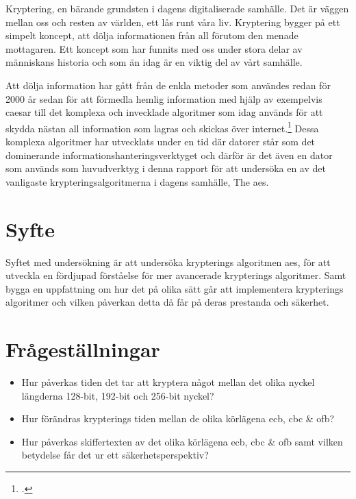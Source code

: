 Kryptering, en bärande grundsten i dagens digitaliserade samhälle. Det är väggen mellan oss och resten
av världen, ett lås runt våra liv. Kryptering bygger på ett simpelt koncept, att dölja informationen
från all förutom den menade mottagaren. Ett koncept som har funnits med oss under stora delar av
människans historia och som än idag är en viktig del av vårt samhälle.

Att dölja information har gått från de enkla metoder som användes redan för 2000 år sedan för att förmedla hemlig information med hjälp av
exempelvis \gls{caesar} till det komplexa och invecklade algoritmer som idag används för att skydda nästan all information som lagras och skickas
över internet.\footcite{luciano1987cryptology} Dessa komplexa algoritmer har utvecklats under en tid där datorer står som det dominerande informationshanteringsverktyget och
därför är det även en dator som används som huvudverktyg i denna rapport för att undersöka en av det vanligaste krypteringsalgoritmerna i dagens samhälle,
The \acrlong{aes}.

\section{Syfte} %
Syftet med undersökning är att undersöka krypterings algoritmen \acrshort{aes},
för att utveckla en fördjupad förståelse för mer avancerade krypterings algoritmer.
Samt bygga en uppfattning om hur det på olika sätt går att implementera krypterings algoritmer
och vilken påverkan detta då får på deras prestanda och säkerhet.

\section{Frågeställningar} %
\begin{itemize}
    \setlength{\itemindent}{-1em}
    \item Hur påverkas tiden det tar att kryptera något mellan det olika nyckel längderna 128-bit,
          192-bit och 256-bit nyckel?

    \item Hur förändras krypterings tiden mellan de olika körlägena \acrshort{ecb}, \acrshort{cbc} \& \acrshort{ofb}?

    \item Hur påverkas skiffertexten av det olika körlägena \acrshort{ecb}, \acrshort{cbc} \& \acrshort{ofb}
          samt vilken betydelse får det ur ett säkerhetsperspektiv?
\end{itemize}

